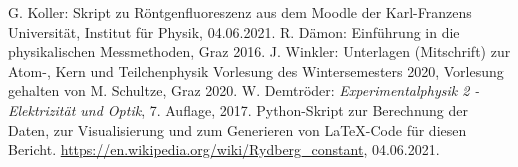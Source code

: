 \documentclass{article}
\begin{document}
\begin{thebibliography}{9}
 G. Koller: Skript zu Röntgenfluoreszenz aus dem Moodle der Karl-Franzens Universität, Institut für Physik, 04.06.2021.
  R. Dämon: Einführung in die physikalischen Messmethoden, Graz 2016.
  J. Winkler: Unterlagen (Mitschrift) zur Atom-, Kern und Teilchenphysik Vorlesung des Wintersemesters 2020, Vorlesung gehalten von M. Schultze, Graz 2020.
 W. Demtröder: \emph{Experimentalphysik 2 - Elektrizität  und Optik}, 7. Auflage, 2017.
 Python-Skript zur Berechnung der Daten, zur Visualisierung und zum Generieren von \LaTeX-Code für diesen Bericht.
 \url{https://en.wikipedia.org/wiki/Rydberg_constant}, 04.06.2021.
\end{thebibliography}


\newpage 




%

%
\end{document}
